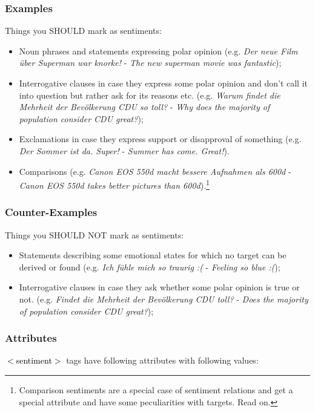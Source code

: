 \documentclass[11pt,a4paper]{article}
\newcommand{\xmltag}[1]{\textcolor{black}{{\small$<$#1$>$}}}
\begin{document}
\subsubsection{Examples}
Things you SHOULD mark as sentiments:
\begin{itemize}
  \item Noun phrases and statements expressing polar opinion
    (e.g. \textit{Der neue Film \"uber Superman war knorke!} -
    \textit{The new superman movie was fantastic});
  \item Interrogative clauses in case they express some polar opinion
    and don't call it into question but rather ask for its reasons
    etc. (e.g. \textit{Warum findet die Mehrheit der Bev\"olkerung CDU
      so toll?} - \textit{Why does the majority of population consider
      CDU great?});
  \item Exclamations in case they express support or disapproval of
    something (e.g. \textit{Der Sommer ist da. Super!} -
    \textit{Summer has come. Great!}).
  \item Comparisons (e.g. \textit{Canon EOS 550d macht bessere
    Aufnahmen als 600d} - \textit{Canon EOS 550d takes better pictures
    than 600d}).\footnote{Comparison sentiments are a special case of
    sentiment relations and get a special attribute and have some
    peculiarities with targets. Read on.}

\end{itemize}

\subsubsection{Counter-Examples}
Things you SHOULD NOT mark as sentiments:
\begin{itemize}
  \item Statements describing some emotional states for which no
    target can be derived or found (e.g. \textit{Ich f\"uhle mich so
      traurig :(} - \textit{Feeling so blue :(});
  \item Interrogative clauses in case they ask whether some polar
    opinion is true or not. (e.g. \textit{Findet die Mehrheit
      der Bev\"olkerung CDU toll?} - \textit{Does the majority
      of population consider CDU great?});
\end{itemize}


\subsubsection{Attributes}
\xmltag{sentiment} tags have following attributes with following
values:
\end{document}
